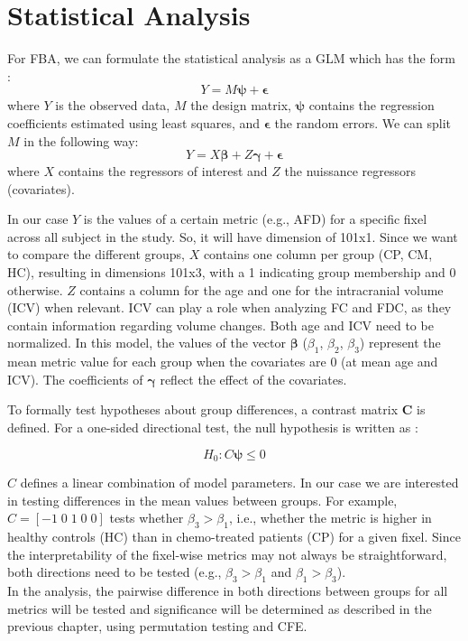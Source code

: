 \section{Statistical Analysis}
For FBA, we can formulate the statistical analysis as a GLM which has the form \cite{Winkler2014}:
\begin{equation}
{Y} = {M} \boldsymbol{\psi} + \boldsymbol{\epsilon}
\end{equation}
where ${Y}$ is the observed data, ${M}$ the design matrix, $\boldsymbol{\psi}$ contains the regression coefficients estimated using least squares, and $\boldsymbol{\epsilon}$ the random errors.
We can split ${M}$ in the following way:
\begin{equation}
{Y} = {X} \boldsymbol{\beta} + {Z} \boldsymbol{\gamma} + \boldsymbol{\epsilon}
\end{equation}
where ${X}$ contains the regressors of interest and ${Z}$ the nuissance regressors (covariates).

In our case ${Y}$ is the values of a certain metric (e.g., AFD) for a specific fixel across all subject in the study. So, it will have dimension of 101x1. Since we want to compare the different groups, ${X}$ contains one column per group (CP, CM, HC), resulting in dimensions 101x3, with a 1 indicating group membership and 0 otherwise. ${Z}$ contains a column for the age and one for the intracranial volume (ICV) when relevant. ICV can play a role when analyzing FC and FDC, as they contain information regarding volume changes. Both age and ICV need to be normalized. In this model, the values of the vector $\boldsymbol{\beta}$ ($\beta_1$, $\beta_2$, $\beta_3$) represent the mean metric value for each group when the covariates are 0 (at mean age and ICV). The coefficients of $\boldsymbol{\gamma}$ reflect the effect of the covariates.

To formally test hypotheses about group differences, a contrast matrix $\mathbf{C}$ is defined. For a one-sided directional test, the null hypothesis is written as \cite{Winkler2014}:

\begin{equation}
H_0: {C}\boldsymbol{\psi} \leq 0
\end{equation}

${C}$ defines a linear combination of model parameters. In our case we are interested in testing differences in the mean values between groups. For example, ${C} = [-1 \; 0 \; 1 \; 0 \; 0]$ tests whether $\beta_3 > \beta_1$, i.e., whether the metric is higher in healthy controls (HC) than in chemo-treated patients (CP) for a given fixel. Since the interpretability of the fixel-wise metrics may not always be straightforward, both directions need to be tested (e.g., $\beta_3 > \beta_1$ and $\beta_1 > \beta_3$).
\\In the analysis,  the pairwise difference in both directions between groups for all metrics will be tested and significance will be determined as described in the previous chapter, using permutation testing and CFE.

